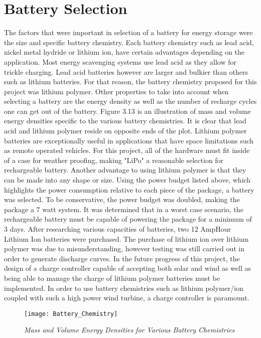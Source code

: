 \section{Battery Selection}
\indent The factors that were important in selection of a battery for energy storage were the size and specific battery chemistry. 
Each battery chemistry such as lead acid, nickel metal hydride or lithium ion, have certain advantages depending on the application. 
Most energy scavenging systems use lead acid as they allow for trickle charging. 
Lead acid batteries  however are larger and bulkier than others such as lithium batteries. 
For that reason, the battery chemistry proposed for this project was lithium polymer.
Other properties to take into account when selecting a battery are the energy density as well as the number of recharge cycles one can get out of the battery. 
Figure 3.13 is an illustration of mass and volume energy densities specific to the various battery chemistries. It is clear that lead acid and lithium polymer reside on opposite ends of the plot. 
\indent Lithium polymer batteries are exceptionally useful in applications that have space limitations such as remote operated vehicles. For this project, all of the hardware must fit inside of a case for weather proofing, making "LiPo" a reasonable selection for rechargeable battery. 
Another advantage to using lithium polymer is that they can be made into any shape or size. 
\indent Using the power budget listed above, which highlights the power consumption relative to each piece of the package, a battery was selected. To be conservative, the power budget was doubled, making the package a 7 watt system. It was determined that in a worst case scenario, the rechargeable battery must be capable of powering the package for a minimum of 3 days. After researching various capacities of batteries, two 12 AmpHour Lithium Ion batteries were purchased. The purchase of lithium ion over lithium polymer was due to misunderstanding, however testing was still carried out in order to generate discharge curves. In the future progress of this project, the design of a charge controller capable of accepting both solar and wind as well as being able to manage the charge of lithium polymer batteries must be implemented. In order to use battery chemistries such as lithium polymer/ion coupled with such a high power wind turbine, a charge controller is paramount. 

\begin{figure}
\centering
\texttt{[image: Battery\_Chemistry]}
\caption{\textit{Mass and Volume Energy Densities for Various Battery Chemistries}}
\label{fig:Battery_Chemistry}
\end{figure}
